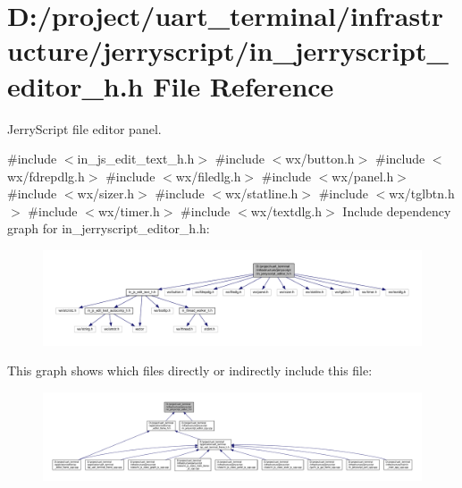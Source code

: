 \section{D\+:/project/uart\+\_\+terminal/infrastructure/jerryscript/in\+\_\+jerryscript\+\_\+editor\+\_\+h.h File Reference}
\label{in__jerryscript__editor__h_8h}


Jerry\+Script file editor panel.  


{\ttfamily \#include $<$in\+\_\+js\+\_\+edit\+\_\+text\+\_\+h.\+h$>$}\newline
{\ttfamily \#include $<$wx/button.\+h$>$}\newline
{\ttfamily \#include $<$wx/fdrepdlg.\+h$>$}\newline
{\ttfamily \#include $<$wx/filedlg.\+h$>$}\newline
{\ttfamily \#include $<$wx/panel.\+h$>$}\newline
{\ttfamily \#include $<$wx/sizer.\+h$>$}\newline
{\ttfamily \#include $<$wx/statline.\+h$>$}\newline
{\ttfamily \#include $<$wx/tglbtn.\+h$>$}\newline
{\ttfamily \#include $<$wx/timer.\+h$>$}\newline
{\ttfamily \#include $<$wx/textdlg.\+h$>$}\newline
Include dependency graph for in\+\_\+jerryscript\+\_\+editor\+\_\+h.\+h\+:
\nopagebreak
\begin{figure}[H]
\begin{center}
\leavevmode
\includegraphics[width=350pt]{in__jerryscript__editor__h_8h__incl}
\end{center}
\end{figure}
This graph shows which files directly or indirectly include this file\+:
\nopagebreak
\begin{figure}[H]
\begin{center}
\leavevmode
\includegraphics[width=350pt]{in__jerryscript__editor__h_8h__dep__incl}
\end{center}
\end{figure}
